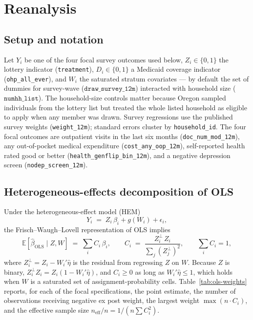 \documentclass[11pt]{article}
\newcommand{\E}{\mathbb{E}}
\begin{document}
\section{Reanalysis}

\subsection{Setup and notation}

Let $Y_{i}$ be one of the four focal survey outcomes used below,
$Z_{i}\in\{0,1\}$ the lottery indicator (\texttt{treatment}),
$D_{i}\in\{0,1\}$ a Medicaid coverage indicator
(\texttt{ohp\_all\_ever}), and $W_{i}$ the saturated stratum
covariates --- by default the set of dummies for survey-wave
($\texttt{draw\_survey\_12m}$) interacted with household size
($\texttt{numhh\_list}$). The household-size controls matter because
Oregon sampled individuals from the lottery list but treated the whole
listed household as eligible to apply when any member was drawn. Survey
regressions use the published survey weights (\texttt{weight\_12m});
standard errors cluster by
\texttt{household\_id}. The four focal outcomes are outpatient visits
in the last six months (\texttt{doc\_num\_mod\_12m}), any out-of-pocket
medical expenditure (\texttt{cost\_any\_oop\_12m}), self-reported
health rated good or better (\texttt{health\_genflip\_bin\_12m}), and
a negative depression screen (\texttt{nodep\_screen\_12m}).

\subsection{Heterogeneous-effects decomposition of OLS}

Under the heterogeneous-effect model (HEM)
\[
    Y_{i} \;=\; Z_{i}\,\beta_{i} + g(W_{i}) + \epsilon_{i},
\]
the Frisch--Waugh--Lovell representation of OLS implies
\begin{equation}\label{eq:hem}
    \E[\hat\beta_{\text{OLS}}\mid Z,W] \;=\; \sum_{i} C_{i}\,\beta_{i},
    \qquad
    C_{i} \;=\; \frac{Z_{i}^{\perp}\,Z_{i}}{\sum_{j} (Z_{j}^{\perp})^{2}},
    \qquad \sum_{i} C_{i} = 1,
\end{equation}
where $Z_{i}^{\perp} = Z_{i} - W_{i}'\hat\eta$ is the residual from
regressing $Z$ on $W$. Because $Z$ is binary, $Z_{i}^{\perp} Z_{i} =
Z_{i}(1 - W_{i}'\hat\eta)$, and $C_{i}\ge 0$ as long as
$W_{i}'\hat\eta\le 1$, which holds when $W$ is a saturated set of
assignment-probability cells.
Table~\ref{tab:ols-weights} reports, for each of the focal
specifications, the point estimate, the number of observations
receiving negative ex post weight, the largest weight $\max(n\cdot
C_{i})$, and the effective sample size
$n_{\text{eff}}/n = 1/(n\sum C_{i}^{2})$.
\end{document}
